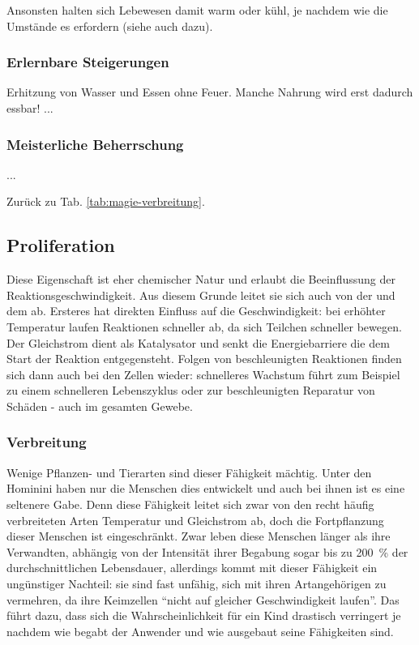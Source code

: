 Ansonsten halten sich Lebewesen damit warm oder kühl, je nachdem wie die Umstände es erfordern (siehe auch  dazu).

\subsubsection{Erlernbare Steigerungen}
\begin{outline}
	\1 Erhitzung von Wasser und Essen ohne Feuer. Manche Nahrung wird erst dadurch essbar!
	\1 ...
\end{outline}

\subsubsection{Meisterliche Beherrschung} 
\begin{outline}
	\1 ...
\end{outline}
Zurück zu Tab. \ref{tab:magie-verbreitung}.



\subsection{Proliferation}\label{magie:proliferation}
Diese Eigenschaft ist eher chemischer Natur und erlaubt die Beeinflussung der Reaktionsgeschwindigkeit.
Aus diesem Grunde leitet sie sich auch von der  und dem  ab.
Ersteres hat direkten Einfluss auf die Geschwindigkeit: bei erhöhter Temperatur laufen Reaktionen schneller ab, da sich Teilchen schneller bewegen.
Der Gleichstrom dient als Katalysator und senkt die Energiebarriere die dem Start der Reaktion entgegensteht.
Folgen von beschleunigten Reaktionen finden sich dann auch bei den Zellen wieder: schnelleres Wachstum führt zum Beispiel zu einem schnelleren Lebenszyklus oder zur beschleunigten Reparatur von Schäden - auch im gesamten Gewebe.

\subsubsection{Verbreitung}
Wenige Pflanzen- und Tierarten sind dieser Fähigkeit mächtig. 
Unter den Hominini haben nur die Menschen dies entwickelt und auch bei ihnen ist es eine seltenere Gabe. 
Denn diese Fähigkeit leitet sich zwar von den recht häufig verbreiteten Arten Temperatur und Gleichstrom ab, doch die Fortpflanzung dieser Menschen ist eingeschränkt.
Zwar leben diese Menschen länger als ihre Verwandten, abhängig von der Intensität ihrer Begabung sogar bis zu \SI{200}{\percent} der durchschnittlichen Lebensdauer, allerdings kommt mit dieser Fähigkeit ein ungünstiger Nachteil:
sie sind fast unfähig, sich mit ihren Artangehörigen zu vermehren, da ihre Keimzellen "`nicht auf gleicher Geschwindigkeit laufen"'.
Das führt dazu, dass sich die Wahrscheinlichkeit für ein Kind drastisch verringert je nachdem wie begabt der Anwender und wie ausgebaut seine Fähigkeiten sind.

